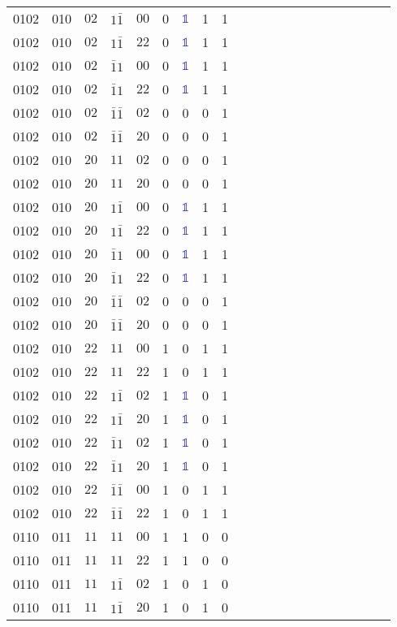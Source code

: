\begin{longtable*}{c| cccccccccccccccccccc }
0102& 010& $02$& $1\bar{1}$& $00$& 0& \textcolor{blue}{$\mathds{1}$}& 1& 1\\
0102& 010& $02$& $1\bar{1}$& $22$& 0& \textcolor{blue}{$\mathds{1}$}& 1& 1\\
0102& 010& $02$& $\bar{1}1$& $00$& 0& \textcolor{blue}{$\mathds{1}$}& 1& 1\\
0102& 010& $02$& $\bar{1}1$& $22$& 0& \textcolor{blue}{$\mathds{1}$}& 1& 1\\
0102& 010& $02$& $\bar{1}\bar{1}$& $02$& 0& 0& 0& 1\\
0102& 010& $02$& $\bar{1}\bar{1}$& $20$& 0& 0& 0& 1\\
0102& 010& $20$& $11$& $02$& 0& 0& 0& 1\\
0102& 010& $20$& $11$& $20$& 0& 0& 0& 1\\
0102& 010& $20$& $1\bar{1}$& $00$& 0& \textcolor{blue}{$\mathds{1}$}& 1& 1\\
0102& 010& $20$& $1\bar{1}$& $22$& 0& \textcolor{blue}{$\mathds{1}$}& 1& 1\\
0102& 010& $20$& $\bar{1}1$& $00$& 0& \textcolor{blue}{$\mathds{1}$}& 1& 1\\
0102& 010& $20$& $\bar{1}1$& $22$& 0& \textcolor{blue}{$\mathds{1}$}& 1& 1\\
0102& 010& $20$& $\bar{1}\bar{1}$& $02$& 0& 0& 0& 1\\
0102& 010& $20$& $\bar{1}\bar{1}$& $20$& 0& 0& 0& 1\\
0102& 010& $22$& $11$& $00$& 1& 0& 1& 1\\
0102& 010& $22$& $11$& $22$& 1& 0& 1& 1\\
0102& 010& $22$& $1\bar{1}$& $02$& 1& \textcolor{blue}{$\mathds{1}$}& 0& 1\\
0102& 010& $22$& $1\bar{1}$& $20$& 1& \textcolor{blue}{$\mathds{1}$}& 0& 1\\
0102& 010& $22$& $\bar{1}1$& $02$& 1& \textcolor{blue}{$\mathds{1}$}& 0& 1\\
0102& 010& $22$& $\bar{1}1$& $20$& 1& \textcolor{blue}{$\mathds{1}$}& 0& 1\\
0102& 010& $22$& $\bar{1}\bar{1}$& $00$& 1& 0& 1& 1\\
0102& 010& $22$& $\bar{1}\bar{1}$& $22$& 1& 0& 1& 1\\
0110& 011& $11$& $11$& $00$& 1& 1& 0& 0\\
0110& 011& $11$& $11$& $22$& 1& 1& 0& 0\\
0110& 011& $11$& $1\bar{1}$& $02$& 1& 0& 1& 0\\
0110& 011& $11$& $1\bar{1}$& $20$& 1& 0& 1& 0\\

\end{longtable*}
